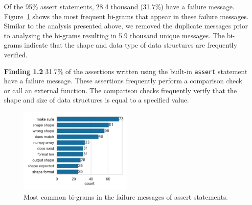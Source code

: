 \documentclass[smallextended]{svjour3}       %
\newcommand{\highlight}[1]{\begin{framed}%
  \noindent#1
\end{framed}}
\begin{document}
Of the 95\% assert statements, 28.4 thousand (31.7\%) have a failure message. Figure~\ref{fig:common-assert-msgs} shows the most frequent bi-grams that appear in these failure messages. Similar to the analysis presented above, we removed the duplicate messages prior to analysing the bi-grams resulting in 5.9 thousand unique messages. The bi-grams indicate that the shape and data type of data structures are frequently verified.

\highlight{\textbf{Finding 1.2} 31.7\% of the assertions written using the built-in \lstinline{assert} statement have a failure message. These assertions frequently perform a comparison check or call an external function. The comparison checks frequently verify that the shape and size of data structures is equal to a specified value.}

\begin{figure}
  \centering
  \includegraphics[width=0.5\textwidth]{common-assert-msgs.pdf}
  \caption{Most common bi-grams in the failure messages of assert statements.}
  \label{fig:common-assert-msgs}
\end{figure}
\end{document}
